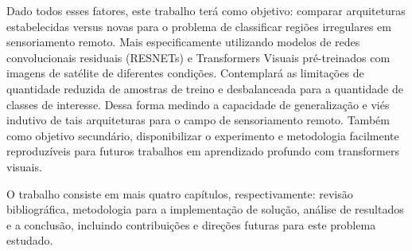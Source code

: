 Dado todos esses fatores, este trabalho terá como objetivo: comparar arquiteturas estabelecidas versus novas  para o problema de classificar regiões irregulares em sensoriamento remoto. Mais especificamente utilizando modelos de redes convolucionais residuais (RESNETs) e Transformers Visuais pré-treinados com imagens de satélite de diferentes condições. Contemplará as limitações de quantidade reduzida de amostras de treino e desbalanceada para a quantidade de classes de interesse. Dessa forma medindo a capacidade de generalização e viés indutivo de tais arquiteturas para o campo de sensoriamento remoto. Também como objetivo secundário, disponibilizar o experimento e metodologia facilmente reproduzíveis para futuros trabalhos em aprendizado profundo com transformers visuais. 

O trabalho consiste em mais quatro capítulos, respectivamente: revisão bibliográfica, metodologia para a implementação de solução, análise de resultados e a conclusão, incluindo contribuições e direções futuras para este problema estudado.




